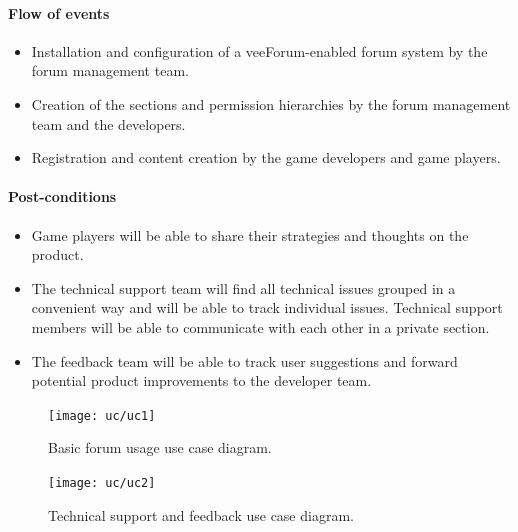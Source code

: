 \documentclass[12pt]{report}
\begin{document}
                    \paragraph{Flow of events}
                        \begin{itemize}
                            \item Installation and configuration of a veeForum-enabled forum system by the forum management team.
                            \item Creation of the sections and permission hierarchies by the forum management team and the developers.
                            \item Registration and content creation by the game developers and game players.
                        \end{itemize}

                    \paragraph{Post-conditions}
                        \begin{itemize}
                            \item Game players will be able to share their strategies and thoughts on the product.
                            \item The technical support team will find all technical issues grouped in a convenient way and will be able to track individual issues. Technical support members will be able to communicate with each other in a private section.
                            \item The feedback team will be able to track user suggestions and forward potential product improvements to the developer team.
                        \end{itemize}

                    \begin{figure}[!htb]
                    \caption{Basic forum usage use case diagram.}
                    \centering
                    \texttt{[image: uc/uc1]}
                    \end{figure}

                    \begin{figure}[!htb]
                    \caption{Technical support and feedback use case diagram.}
                    \centering
                    \texttt{[image: uc/uc2]}
                    \end{figure}
\end{document}
